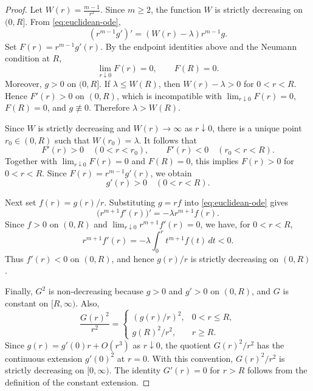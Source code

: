 \documentclass[11pt,letterpaper,reqno]{amsart}
\theoremstyle{definition}
\begin{document}
\begin{proof}
Let $W(r)=\frac{m-1}{r^2}$. Since \(m\ge2\), the function \(W\) is strictly decreasing on \((0,R]\).
From \eqref{eq:euclidean-ode},
\[
        (r^{m-1}g')'=(W(r)-\lambda)r^{m-1}g.
\]
Set $F(r)=r^{m-1}g'(r)$. By the endpoint identities above and the Neumann condition at \(R\),
\[
        \lim_{r\downarrow0}F(r)=0,
        \qquad
        F(R)=0.
\]
Moreover, \(g>0\) on \((0,R]\). If \(\lambda\leq W(R)\), then
\(W(r)-\lambda>0\) for \(0<r<R\). Hence \(F'(r)>0\) on \((0,R)\), which is
incompatible with \(\lim_{r\downarrow0}F(r)=0\), \(F(R)=0\), and
\(g\not\equiv0\). Therefore \(\lambda>W(R)\).

Since \(W\) is strictly decreasing and \(W(r)\to\infty\) as \(r\downarrow0\), there is a unique point \(r_0\in(0,R)\) such that $W(r_0)=\lambda$. It follows that
\[
        F'(r)>0\quad(0<r<r_0),
        \qquad
        F'(r)<0\quad(r_0<r<R).
\]
Together with \(\lim_{r\downarrow0}F(r)=0\) and \(F(R)=0\), this implies \(F(r)>0\) for \(0<r<R\). Since \(F(r)=r^{m-1}g'(r)\), we obtain
\[
        g'(r)>0\quad(0<r<R).
\]

Next set $f(r)=g(r)/r$. Substituting \(g=rf\) into \eqref{eq:euclidean-ode} gives
\[
        \bigl(r^{m+1} f'(r)\bigr)'=-\lambda r^{m+1} f(r).
\]
Since \(f>0\) on \((0,R)\) and $\lim_{r\downarrow0}r^{m+1}f'(r)=0$, we have, for \(0<r<R\),
\[
        r^{m+1}f'(r)
        =
        -\lambda\int_0^r t^{m+1}f(t)\,dt<0.
\]
Thus \(f'(r)<0\) on \((0,R)\), and hence \(g(r)/r\) is strictly decreasing
on \((0,R)\).


Finally, \(G^2\) is non-decreasing because \(g>0\) and \(g'>0\) on
\((0,R)\), and \(G\) is constant on \([R,\infty)\). Also,
\[
        \frac{G(r)^2}{r^2}
        =
        \begin{cases}
        \left(g(r)/r\right)^2,&0<r\leq R,\\
        g(R)^2/r^2,&r\geq R.
        \end{cases}
\]
Since \(g(r)=g'(0)r+O(r^3)\) as \(r\downarrow0\), the quotient
\(G(r)^2/r^2\) has the continuous extension \(g'(0)^2\) at \(r=0\).
With this convention, \(G(r)^2/r^2\) is strictly decreasing on
\([0,\infty)\). The identity \(G'(r)=0\) for \(r>R\) follows from the
definition of the constant extension.
\end{proof}
\end{document}
